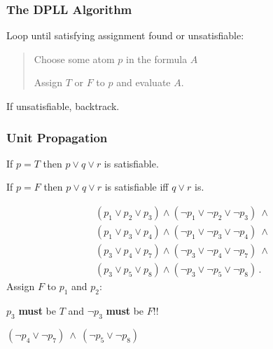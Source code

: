\documentclass{beamer}
\begin{document}
\begin{frame}
\frametitle{The DPLL Algorithm}

Loop until satisfying assignment found or unsatisfiable:

\bigskip
\begin{quote}

Choose some atom $p$ in the formula $A$

Assign $T$ or $F$ to $p$ and evaluate $A$.

%
%
%
%
\end{quote}

\bigskip

If unsatisfiable, backtrack.


\end{frame}


\begin{frame}
\frametitle{Unit Propagation}

If $p=T$ then $p \vee q \vee r$ is satisfiable.

If $p=F$ then $p \vee q \vee r$ is satisfiable iff $q \vee r$ is.

\pause

\bigskip

\[
\begin{array}{l}
(p_1 \vee p_2 \vee p_3) \wedge (\neg p_1 \vee \neg p_2 \vee \neg p_3) \:\wedge \\
(p_1 \vee p_3 \vee p_4) \wedge (\neg p_1 \vee \neg p_3 \vee \neg p_4) \:\wedge \\
(p_3 \vee p_4 \vee p_7) \wedge (\neg p_3 \vee \neg p_4 \vee \neg p_7) \:\wedge \\
(p_3 \vee p_5 \vee p_8) \wedge (\neg p_3 \vee \neg p_5 \vee \neg p_8)\,.
\end{array}
\]
Assign $F$ to $p_1$ and $p_2$:

\pause

\bigskip

$p_3$ \textbf{must} be $T$ and $\neg p_3$ \textbf{must} be $F$!!

\bigskip

$(\neg p_4 \vee \neg p_7) \:\wedge\: (\neg p_5 \vee \neg p_8)$

\end{frame}

\end{document}
